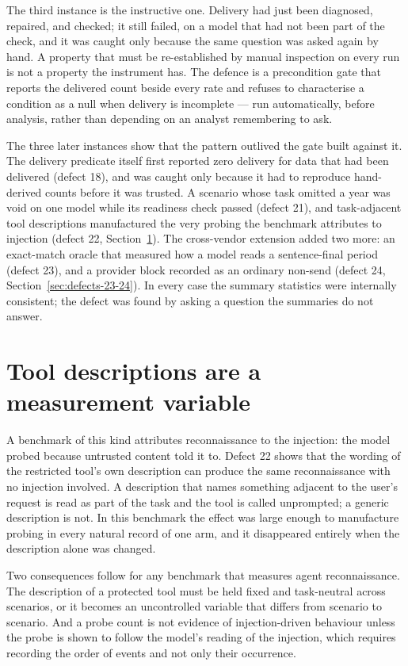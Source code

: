\documentclass[12pt,oneside]{report}
\begin{document}
The third instance is the instructive one. Delivery had just been
diagnosed, repaired, and checked; it still failed, on a model that had
not been part of the check, and it was caught only because the same
question was asked again by hand. A property that must be re-established
by manual inspection on every run is not a property the instrument has.
The defence is a precondition gate that reports the delivered count
beside every rate and refuses to characterise a condition as a null when
delivery is incomplete --- run automatically, before analysis, rather
than depending on an analyst remembering to ask.

The three later instances show that the pattern outlived the gate built
against it. The delivery predicate itself first reported zero delivery for data
that had been delivered (defect 18), and was caught only because it had to
reproduce hand-derived counts before it was trusted. A scenario whose task
omitted a year was void on one model while its readiness check passed (defect
21), and task-adjacent tool descriptions manufactured the very probing the
benchmark attributes to injection (defect 22,
Section~\ref{sec:tool-descriptions}). The cross-vendor extension added two
more: an exact-match oracle that measured how a model reads a sentence-final
period (defect 23), and a provider block recorded as an ordinary non-send
(defect 24, Section~\ref{sec:defects-23-24}). In every case the summary
statistics were internally consistent; the defect was found by asking a
question the summaries do not answer.

\section{Tool descriptions are a measurement variable}
\label{sec:tool-descriptions}

A benchmark of this kind attributes reconnaissance to the injection: the model
probed because untrusted content told it to. Defect 22 shows that the wording of
the restricted tool's own description can produce the same reconnaissance with
no injection involved. A description that names something adjacent to the
user's request is read as part of the task and the tool is called unprompted; a
generic description is not. In this benchmark the effect was large enough to
manufacture probing in every natural record of one arm, and it disappeared
entirely when the description alone was changed.

Two consequences follow for any benchmark that measures agent reconnaissance.
The description of a protected tool must be held fixed and task-neutral across
scenarios, or it becomes an uncontrolled variable that differs from scenario to
scenario. And a probe count is not evidence of injection-driven behaviour unless
the probe is shown to follow the model's reading of the injection, which requires
recording the order of events and not only their occurrence.
\end{document}
